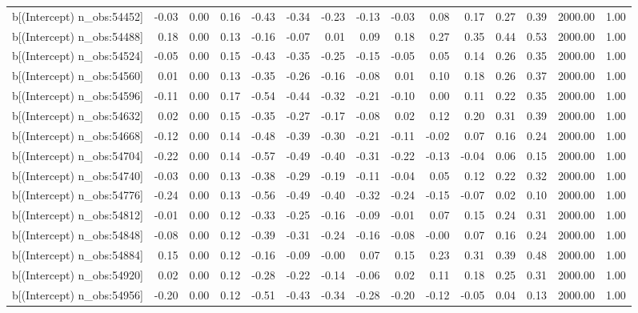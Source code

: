 \begin{table}[ht]
\begin{tabular}{rrrrrrrrrrrrrrr}
  b[(Intercept) n\_obs:54452] & -0.03 & 0.00 & 0.16 & -0.43 & -0.34 & -0.23 & -0.13 & -0.03 & 0.08 & 0.17 & 0.27 & 0.39 & 2000.00 & 1.00 \\ 
  b[(Intercept) n\_obs:54488] & 0.18 & 0.00 & 0.13 & -0.16 & -0.07 & 0.01 & 0.09 & 0.18 & 0.27 & 0.35 & 0.44 & 0.53 & 2000.00 & 1.00 \\ 
  b[(Intercept) n\_obs:54524] & -0.05 & 0.00 & 0.15 & -0.43 & -0.35 & -0.25 & -0.15 & -0.05 & 0.05 & 0.14 & 0.26 & 0.35 & 2000.00 & 1.00 \\ 
  b[(Intercept) n\_obs:54560] & 0.01 & 0.00 & 0.13 & -0.35 & -0.26 & -0.16 & -0.08 & 0.01 & 0.10 & 0.18 & 0.26 & 0.37 & 2000.00 & 1.00 \\ 
  b[(Intercept) n\_obs:54596] & -0.11 & 0.00 & 0.17 & -0.54 & -0.44 & -0.32 & -0.21 & -0.10 & 0.00 & 0.11 & 0.22 & 0.35 & 2000.00 & 1.00 \\ 
  b[(Intercept) n\_obs:54632] & 0.02 & 0.00 & 0.15 & -0.35 & -0.27 & -0.17 & -0.08 & 0.02 & 0.12 & 0.20 & 0.31 & 0.39 & 2000.00 & 1.00 \\ 
  b[(Intercept) n\_obs:54668] & -0.12 & 0.00 & 0.14 & -0.48 & -0.39 & -0.30 & -0.21 & -0.11 & -0.02 & 0.07 & 0.16 & 0.24 & 2000.00 & 1.00 \\ 
  b[(Intercept) n\_obs:54704] & -0.22 & 0.00 & 0.14 & -0.57 & -0.49 & -0.40 & -0.31 & -0.22 & -0.13 & -0.04 & 0.06 & 0.15 & 2000.00 & 1.00 \\ 
  b[(Intercept) n\_obs:54740] & -0.03 & 0.00 & 0.13 & -0.38 & -0.29 & -0.19 & -0.11 & -0.04 & 0.05 & 0.12 & 0.22 & 0.32 & 2000.00 & 1.00 \\ 
  b[(Intercept) n\_obs:54776] & -0.24 & 0.00 & 0.13 & -0.56 & -0.49 & -0.40 & -0.32 & -0.24 & -0.15 & -0.07 & 0.02 & 0.10 & 2000.00 & 1.00 \\ 
  b[(Intercept) n\_obs:54812] & -0.01 & 0.00 & 0.12 & -0.33 & -0.25 & -0.16 & -0.09 & -0.01 & 0.07 & 0.15 & 0.24 & 0.31 & 2000.00 & 1.00 \\ 
  b[(Intercept) n\_obs:54848] & -0.08 & 0.00 & 0.12 & -0.39 & -0.31 & -0.24 & -0.16 & -0.08 & -0.00 & 0.07 & 0.16 & 0.24 & 2000.00 & 1.00 \\ 
  b[(Intercept) n\_obs:54884] & 0.15 & 0.00 & 0.12 & -0.16 & -0.09 & -0.00 & 0.07 & 0.15 & 0.23 & 0.31 & 0.39 & 0.48 & 2000.00 & 1.00 \\ 
  b[(Intercept) n\_obs:54920] & 0.02 & 0.00 & 0.12 & -0.28 & -0.22 & -0.14 & -0.06 & 0.02 & 0.11 & 0.18 & 0.25 & 0.31 & 2000.00 & 1.00 \\ 
  b[(Intercept) n\_obs:54956] & -0.20 & 0.00 & 0.12 & -0.51 & -0.43 & -0.34 & -0.28 & -0.20 & -0.12 & -0.05 & 0.04 & 0.13 & 2000.00 & 1.00 \\ 

\end{tabular}
\end{table}
